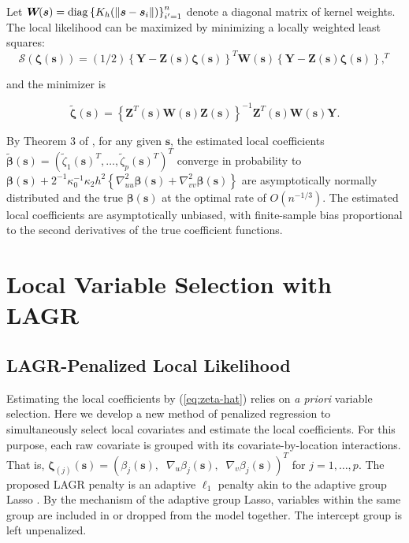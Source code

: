 \documentclass[authoryear,review, 12pt]{elsarticle}
\begin{document}
Let $\bm{W}\!(\bm{s})={\rm diag}\left\{ K_{h}(\|\bm{s}-\bm{s}_{i}\|)\right\} _{i'=1}^{n}$
denote a diagonal matrix of kernel weights. The local likelihood can
be maximized by minimizing a locally weighted least squares: 
\begin{equation}
\mathcal{S}\left(\bm{\zeta}(\bm{s})\right)=(1/2)\left\{ \bm{Y}-\bm{Z}(\bm{s})\bm{\zeta}(\bm{s})\right\} ^{T}\bm{W}\!(\bm{s})\left\{ \bm{Y}-\bm{Z}(\bm{s})\bm{\zeta}(\bm{s})\right\} ,^{T}\label{eq:local-sum-of-squares}
\end{equation}


and the minimizer is

\begin{equation}
\tilde{\bm{\zeta}}(\bm{s})=\left\{ \bm{Z}^{T}(\bm{s})\bm{W}\!(\bm{s})\bm{Z}(\bm{s})\right\} ^{-1}\bm{Z}^{T}(\bm{s})\bm{W}\!(\bm{s})\bm{Y}.\label{eq:zeta-hat}
\end{equation}


By Theorem 3 of \citet{Sun-Yan-Zhang-Lu-2014}, for any given $\bm{s}$,
the estimated local coefficients $\tilde{\bm{\beta}}(\bm{s})=\left(\tilde{\zeta}_{1}(\bm{s})^{T},\dots,\tilde{\zeta}_{p}(\bm{s})^{T}\right)^{T}$
converge in probability to $\bm{\beta}(\bm{s})+2^{-1}\kappa_{0}^{-1}\kappa_{2}h^{2}\left\{ \nabla_{uu}^{2}\bm{\beta}(\bm{s})+\nabla_{vv}^{2}\bm{\beta}(\bm{s})\right\} $
are asymptotically normally distributed and the true $\bm{\beta}(\bm{s})$
at the optimal rate of $O\left(n^{-1/3}\right)$. The estimated local
coefficients are asymptotically unbiased, with finite-sample bias
proportional to the second derivatives of the true coefficient functions.


\section{Local Variable Selection with LAGR\label{sec:lagr-gaussian}}


\subsection{LAGR-Penalized Local Likelihood}

Estimating the local coefficients by (\ref{eq:zeta-hat}) relies on
\emph{a priori} variable selection. Here we develop a new method of
penalized regression to simultaneously select local covariates and
estimate the local coefficients. For this purpose, each raw covariate
is grouped with its covariate-by-location interactions. That is, $\bm{\zeta}_{(j)}(\bm{s})=\left(\beta_{j}(\bm{s}),\;\;\nabla_{u}\beta_{j}(\bm{s}),\;\;\nabla_{v}\beta_{j}(\bm{s})\right)^{T}$
for $j=1,\dots,p$. The proposed LAGR penalty is an adaptive $\ell_{1}$
penalty akin to the adaptive group Lasso \citep{Zou-2006,Wang-Leng-2008}.
By the mechanism of the adaptive group Lasso, variables within the
same group are included in or dropped from the model together. The
intercept group is left unpenalized.
\end{document}
